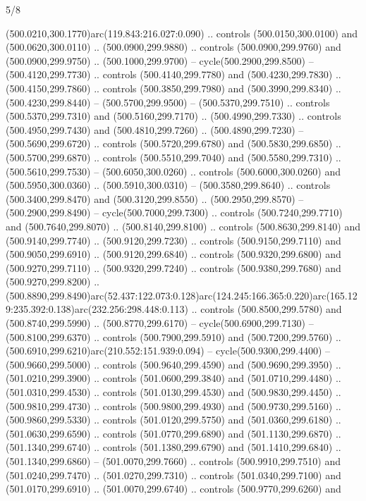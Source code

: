 \begin{flagdescription}{5/8}
\begin{scope}[xshift=0.5\flaglength,yshift=0.5\flagwidth,scale=\flagwidth/475.63]
\begin{scope}[y=0.8pt, x=0.8pt, yscale=-1, xscale=1,shift={(-450,-300)}]
\begin{scope}[cm={{1.0,0.0,0.0,1.0,(-0.0002,0.12556)}},cm={{1.0,0.0,0.0,1.0,(0.00179,0.0)}}]
\begin{scope}[cm={{1.11592,0.0,0.0,1.11592,(-106.89933,-41.77764)}}]
\begin{scope}[draw=black,fill=cfff]
\begin{scope}[fill=black]
  (500.0210,300.1770)arc(119.843:216.027:0.090) .. controls (500.0150,300.0100)
  and (500.0620,300.0110) .. (500.0900,299.9880) .. controls (500.0900,299.9760)
  and (500.0900,299.9750) .. (500.1000,299.9700) -- cycle(500.2900,299.8500) --
  (500.4120,299.7730) .. controls (500.4140,299.7780) and (500.4230,299.7830) ..
  (500.4150,299.7860) .. controls (500.3850,299.7980) and (500.3990,299.8340) ..
  (500.4230,299.8440) -- (500.5700,299.9500) -- (500.5370,299.7510) .. controls
  (500.5370,299.7310) and (500.5160,299.7170) .. (500.4990,299.7330) .. controls
  (500.4950,299.7430) and (500.4810,299.7260) .. (500.4890,299.7230) --
  (500.5690,299.6720) .. controls (500.5720,299.6780) and (500.5830,299.6850) ..
  (500.5700,299.6870) .. controls (500.5510,299.7040) and (500.5580,299.7310) ..
  (500.5610,299.7530) -- (500.6050,300.0260) .. controls (500.6000,300.0260) and
  (500.5950,300.0360) .. (500.5910,300.0310) -- (500.3580,299.8640) .. controls
  (500.3400,299.8470) and (500.3120,299.8550) .. (500.2950,299.8570) --
  (500.2900,299.8490) -- cycle(500.7000,299.7300) .. controls
  (500.7240,299.7710) and (500.7640,299.8070) .. (500.8140,299.8100) .. controls
  (500.8630,299.8140) and (500.9140,299.7740) .. (500.9120,299.7230) .. controls
  (500.9150,299.7110) and (500.9050,299.6910) .. (500.9120,299.6840) .. controls
  (500.9320,299.6800) and (500.9270,299.7110) .. (500.9320,299.7240) .. controls
  (500.9380,299.7680) and (500.9270,299.8200) ..
  (500.8890,299.8490)arc(52.437:122.073:0.128)arc(124.245:166.365:0.220)arc(165.129:235.392:0.138)arc(232.256:298.448:0.113)
  .. controls (500.8500,299.5780) and (500.8740,299.5990) .. (500.8770,299.6170)
  -- cycle(500.6900,299.7130) -- (500.8100,299.6370) .. controls
  (500.7900,299.5910) and (500.7200,299.5760) ..
  (500.6910,299.6210)arc(210.552:151.939:0.094) -- cycle(500.9300,299.4400) --
  (500.9660,299.5000) .. controls (500.9640,299.4590) and (500.9690,299.3950) ..
  (501.0210,299.3900) .. controls (501.0600,299.3840) and (501.0710,299.4480) ..
  (501.0310,299.4530) .. controls (501.0130,299.4530) and (500.9830,299.4450) ..
  (500.9810,299.4730) .. controls (500.9800,299.4930) and (500.9730,299.5160) ..
  (500.9860,299.5330) .. controls (501.0120,299.5750) and (501.0360,299.6180) ..
  (501.0630,299.6590) .. controls (501.0770,299.6890) and (501.1130,299.6870) ..
  (501.1340,299.6740) .. controls (501.1380,299.6790) and (501.1410,299.6840) ..
  (501.1340,299.6860) -- (501.0070,299.7660) .. controls (500.9910,299.7510) and
  (501.0240,299.7470) .. (501.0270,299.7310) .. controls (501.0340,299.7100) and
  (501.0170,299.6910) .. (501.0070,299.6740) .. controls (500.9770,299.6260) and

\end{scope}
\end{scope}
\end{scope}
\end{scope}
\end{scope}
\end{scope}
\end{flagdescription}
